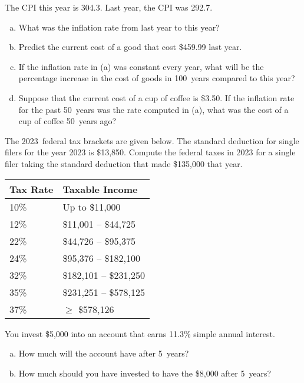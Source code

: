 \documentclass[11pt,letterpaper]{article}
\begin{document}

 The CPI this year is 304.3. Last year, the CPI was 292.7. 
	\begin{enumerate}[(a)]
	\item What was the inflation rate from last year to this year?
	\item Predict the current cost of a good that cost \$459.99 last year. 
	\item If the inflation rate in (a) was constant every year, what will be the percentage increase in the cost of goods in 100~years compared to this year?
	\item Suppose that the current cost of a cup of coffee is \$3.50. If the inflation rate for the past 50~years was the rate computed in (a), what was the cost of a cup of coffee 50~years ago?
	\end{enumerate}



\newpage



 The 2023~federal tax brackets are given below. The standard deduction for single filers for the year 2023 is \$13,850. Compute the federal taxes in 2023 for a single filer taking the standard deduction that made \$135,000 that year. 
	\begin{table}[H]
	\centering
	\begin{tabular}{|l|l|} \hline
	Tax Rate & Taxable Income \\ \hline \hline
	10\% & Up to \$11,000 \\ \hline
	12\% & \$11,001 -- \$44,725 \\ \hline
	22\% & \$44,726 -- \$95,375 \\ \hline
	24\% & \$95,376 -- \$182,100 \\ \hline
	32\% & \$182,101 -- \$231,250 \\ \hline
	35\% & \$231,251 -- \$578,125 \\ \hline
	37\% & $\geq$ \$578,126 \\ \hline
	\end{tabular}
	\end{table}



\newpage



 You invest \$5,000 into an account that earns 11.3\% simple annual interest. 
	\begin{enumerate}[(a)]
	\item How much will the account have after 5~years?
	\item How much should you have invested to have the \$8,000 after 5~years?
	\end{enumerate}
\end{document}
